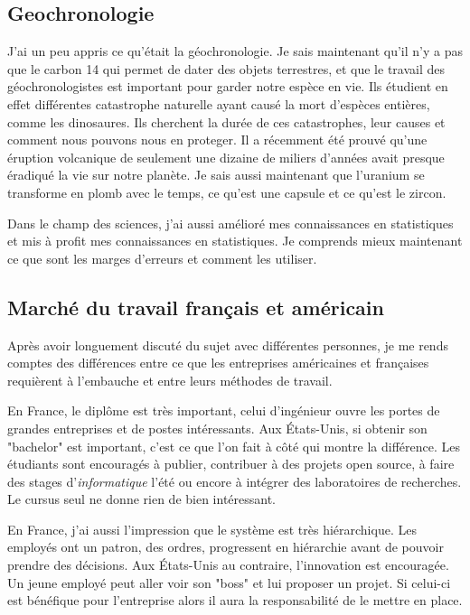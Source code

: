 \subsection{Geochronologie}
J'ai un peu appris ce qu'était la géochronologie. Je sais maintenant qu'il n'y a pas que le carbon 14 qui permet de dater des objets terrestres, et que le travail des géochronologistes est important pour garder notre espèce en vie. Ils étudient en effet différentes catastrophe naturelle ayant causé la mort d'espèces entières, comme les dinosaures. Ils cherchent la durée de ces catastrophes, leur causes et comment nous pouvons nous en proteger. Il a récemment été prouvé qu'une éruption volcanique de seulement une dizaine de miliers d'années avait presque éradiqué la vie sur notre planète.
Je sais aussi maintenant que l'uranium se transforme en plomb avec le temps, ce qu'est une capsule et ce qu'est le zircon.

Dans le champ des sciences, j'ai aussi amélioré mes connaissances en statistiques et mis à profit mes connaissances en statistiques. Je comprends mieux maintenant ce que sont les marges d'erreurs et comment les utiliser.

\subsection{Marché du travail français et américain}
Après avoir longuement discuté du sujet avec différentes personnes, je me rends comptes des différences entre ce que les entreprises américaines et françaises requièrent à l'embauche et entre leurs méthodes de travail. 

En France, le diplôme est très important, celui d'ingénieur ouvre les portes de grandes entreprises et de postes intéressants. Aux États-Unis, si obtenir son "bachelor" est important, c'est ce que l'on fait à côté qui montre la différence. Les étudiants sont encouragés à publier, contribuer à des projets open source, à faire des stages d'\emph{informatique} l'été ou encore à intégrer des laboratoires de recherches. Le cursus seul ne donne rien de bien intéressant.

En France, j'ai aussi l'impression que le système est très hiérarchique. Les employés ont un patron, des ordres, progressent en hiérarchie avant de pouvoir prendre des décisions. Aux États-Unis au contraire, l'innovation est encouragée. Un jeune employé peut aller voir son "boss" et lui proposer un projet. Si celui-ci est bénéfique pour l'entreprise alors il aura la responsabilité de le mettre en place. 

